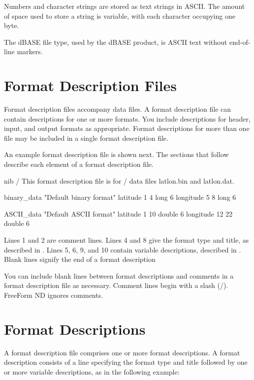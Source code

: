 Numbers and character strings are stored as text strings in ASCII. The
amount of space used to store a string is variable, with each
character occupying one byte.

The dBASE file type, used by the dBASE product, is ASCII text without
end-of-line markers.

\section{Format Description Files}

Format description files accompany data files. A format description
file can contain descriptions for one or more formats. You include
descriptions for header, input, and output formats as appropriate.
Format descriptions for more than one file may be included in a single
format description file.

An example format description file is shown next. The sections that
follow describe each element of a format description file.

\begin{vcode}{nib}
/ This format description file is for
/ data files latlon.bin and latlon.dat. 

binary_data "Default binary format"
latitude 1 4 long 6
longitude 5 8 long 6

ASCII_data "Default ASCII format"
latitude 1 10 double 6
longitude 12 22 double 6
\end{vcode}

Lines 1 and 2 are comment lines.  Lines 4 and 8 give the format type
and title, as described in . Lines 5, 6,
9, and 10 contain variable descriptions, described in
.  Blank lines signify the end of a format
description

You can include blank lines between format descriptions and comments
in a format description file as necessary.  Comment lines begin with a
slash (/). FreeForm ND ignores comments.

\section{Format Descriptions}
\label{ff,tblfmt,formatdesc}

A format description file comprises one or more format descriptions. A
format description consists of a line specifying the format type and
title followed by one or more variable descriptions, as in the
following example: 

